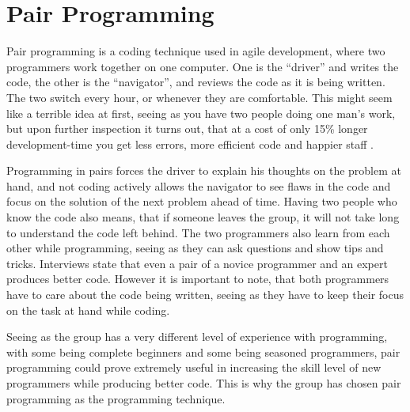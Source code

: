 \section{Pair Programming}
Pair programming is a coding technique used in agile development, where two programmers work together on one computer. 
One is the ``driver'' and writes the code, the other is the ``navigator'', and reviews the code as it is being written. 
The two switch every hour, or whenever they are comfortable. 
This might seem like a terrible idea at first, seeing as you have two people doing one man's work, 
but upon further inspection it turns out, that at a cost of only 15\% longer development-time 
you get less errors, more efficient code and happier staff \cite{cockburn00}. 

Programming in pairs forces the driver to explain his thoughts on the problem at hand, 
and not coding actively allows the navigator to see flaws in the code 
and focus on the solution of the next problem ahead of time. Having two people who know the code also
means, that if someone leaves the group, it will not take long to understand the code left behind.
The two programmers also learn from each other while programming, seeing as they can ask questions and show tips and tricks. Interviews state that even a pair of a novice programmer and an expert produces better code.\cite{cockburn00} However it is important to note, that both programmers have to care about the code being written, seeing as they have to keep their focus on the task at hand while coding.

Seeing as the group has a very different level of experience with programming, with some being complete beginners and some being seasoned programmers, pair programming could prove extremely useful in increasing the skill level of new programmers while producing better code. This is why the group has chosen pair programming as the programming technique.